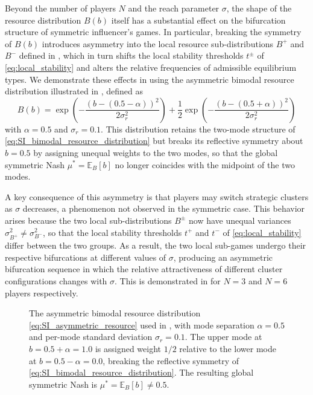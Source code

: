 \documentclass{article}
\begin{document}
                Beyond the number of players $N$ and the reach parameter $\sigma$, the shape of the resource distribution $B(b)$ itself has a substantial effect on the bifurcation structure of symmetric influencer's games. In particular, breaking the symmetry of $B(b)$ introduces asymmetry into the local resource sub-distributions $B^+$ and $B^-$ defined in , which in turn shifts the local stability thresholds $t^\pm$ of \cref{eq:local_stability} and alters the relative frequencies of admissible equilibrium types. We demonstrate these effects in  using the asymmetric bimodal resource distribution illustrated in , defined as
                \begin{equation}\label{eq:SI_asymmetric_resource}
                    B(b) = \exp\!\left(-\frac{(b - (0.5 - \alpha))^2}{2\sigma_r^2}\right) + 
                    \frac{1}{2}\exp\!\left(-\frac{(b - (0.5 + \alpha))^2}{2\sigma_r^2}\right)
                \end{equation}
                with $\alpha = 0.5$ and $\sigma_r = 0.1$. This distribution retains the two-mode structure of \cref{eq:SI_bimodal_resource_distribution} but breaks its reflective symmetry about $b = 0.5$ by assigning unequal weights to the two modes, so that the global symmetric Nash $\mu^* = \mathbb{E}_B[b]$ no longer coincides with the midpoint of the two modes.

                A key consequence of this asymmetry is that players may switch strategic clusters as $\sigma$ decreases, a phenomenon not observed in the symmetric case. This behavior arises because the two local sub-distributions $B^\pm$ now have unequal variances $\sigma_{B^+}^2 \neq \sigma_{B^-}^2$, so that the local stability thresholds $t^+$ and $t^-$ of \cref{eq:local_stability} differ between the two groups. As a result, the two local sub-games undergo their respective bifurcations at different values of $\sigma$, producing an asymmetric bifurcation sequence in which the relative attractiveness of different cluster configurations changes with $\sigma$. This is demonstrated in  for $N = 3$ and $N = 6$ players respectively.

                \begin{figure}[ht!]
                    \centering
                    
                    \caption{The asymmetric bimodal resource distribution \cref{eq:SI_asymmetric_resource} used in , with mode  separation $\alpha = 0.5$ and per-mode standard deviation $\sigma_r = 0.1$. The upper mode at $b = 0.5 + \alpha = 1.0$ is assigned weight $1/2$ relative to the lower mode at $b = 0.5 - \alpha = 0.0$, breaking the reflective symmetry of \cref{eq:SI_bimodal_resource_distribution}. The resulting global symmetric Nash is $\mu^* = \mathbb{E}_B[b] \neq 0.5$.}
                    \label{fig:asymm_bifurcation:a}
                \end{figure}
\end{document}
